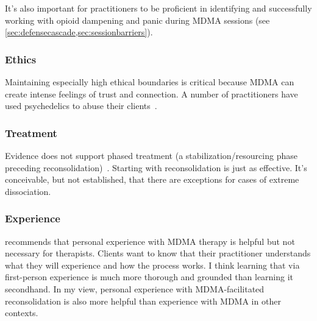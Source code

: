 \documentclass[11pt,oneside]{book}
\let\cite\parencite
\begin{document}
It's also important for practitioners to be proficient in identifying and successfully working with opioid dampening and panic during MDMA sessions (see \cref{sec:defensecascade,sec:sessionbarriers}).

\subsubsection*{Ethics}
Maintaining especially high ethical boundaries is critical because MDMA can create intense feelings of trust and connection. A number of practitioners have used psychedelics to abuse their clients~\cite{hallMad,davidsonEisner}.

\subsubsection*{Treatment}
Evidence does not support phased treatment (a stabilization/resourcing phase preceding reconsolidation)~\cite{selePhased,oprelPhased,vlietPhased}. Starting with reconsolidation is just as effective. It's conceivable, but not established, that there are exceptions for cases of extreme dissociation.

\subsubsection*{Experience}
\textcite{simmering} recommends that personal experience with MDMA therapy is helpful but not necessary for therapists. Clients want to know that their practitioner understands what they will experience and how the process works. I think learning that via first-person experience is much more thorough and grounded than learning it secondhand. In my view, personal experience with MDMA-facilitated reconsolidation is also more helpful than experience with MDMA in other contexts.
\end{document}
